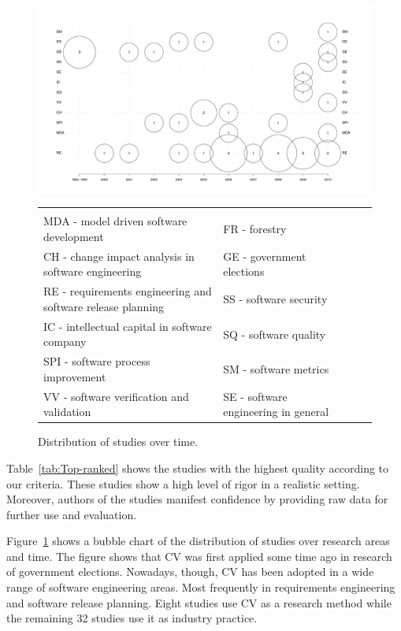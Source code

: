 %
\begin{figure}

\includegraphics[bb=70bp 40bp 1180bp 670bp,clip,scale=0.3]{fig/bubble}

\begin{tabular}
{l>{\raggedright}b{}l>{\raggedright}b{}l} 
&\tabularnewline
\tiny
MDA - model driven software development  					& \tiny FR - forestry  \tabularnewline
\tiny CH - change impact analysis in software engineering 			& \tiny GE - government elections \tabularnewline
\tiny RE - requirements engineering and software release planning 	& \tiny SS - software security \tabularnewline
\tiny IC - intellectual capital in software company 				& \tiny SQ - software quality \tabularnewline
\tiny SPI - software process improvement 						& \tiny SM - software metrics \tabularnewline
\tiny VV - software verification and validation & \tiny SE - software engineering in general\tabularnewline
\end{tabular}
\caption{\label{fig:bubble}Distribution of studies over time.}

\end{figure}

Table~\ref{tab:Top-ranked} shows the studies with the highest quality according to our criteria.
These studies show a high level of rigor in a realistic setting. Moreover, authors of the studies manifest
confidence by providing raw data for further use and evaluation.

Figure~\ref{fig:bubble} shows a bubble chart of the distribution of studies over research areas and time.
The figure shows that CV was first applied some time ago in research of government elections.
Nowadays, though, CV has been adopted in a wide range of software engineering areas.
Most frequently in requirements engineering and software release planning.
Eight studies use CV as a research method while the remaining 32 studies use it as industry practice.

